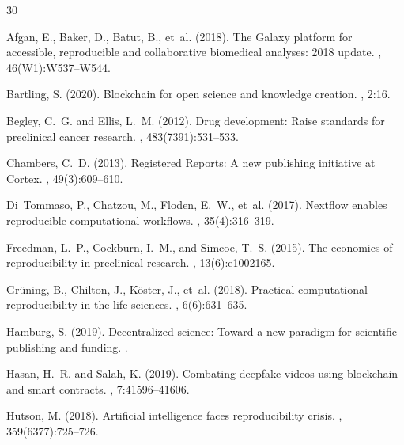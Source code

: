 \begin{thebibliography}{30}

Afgan, E., Baker, D., Batut, B., et~al. (2018).
\newblock The Galaxy platform for accessible, reproducible and collaborative biomedical analyses: 2018 update.
, 46(W1):W537--W544.

Bartling, S. (2020).
\newblock Blockchain for open science and knowledge creation.
, 2:16.

Begley, C.~G. and Ellis, L.~M. (2012).
\newblock Drug development: Raise standards for preclinical cancer research.
, 483(7391):531--533.

Chambers, C.~D. (2013).
\newblock Registered Reports: A new publishing initiative at Cortex.
, 49(3):609--610.

Di~Tommaso, P., Chatzou, M., Floden, E.~W., et~al. (2017).
\newblock Nextflow enables reproducible computational workflows.
, 35(4):316--319.

Freedman, L.~P., Cockburn, I.~M., and Simcoe, T.~S. (2015).
\newblock The economics of reproducibility in preclinical research.
, 13(6):e1002165.

Gr\"{u}ning, B., Chilton, J., K\"{o}ster, J., et~al. (2018).
\newblock Practical computational reproducibility in the life sciences.
, 6(6):631--635.

Hamburg, S. (2019).
\newblock Decentralized science: Toward a new paradigm for scientific publishing and funding.
.

Hasan, H.~R. and Salah, K. (2019).
\newblock Combating deepfake videos using blockchain and smart contracts.
, 7:41596--41606.

Hutson, M. (2018).
\newblock Artificial intelligence faces reproducibility crisis.
, 359(6377):725--726.


\end{thebibliography}
